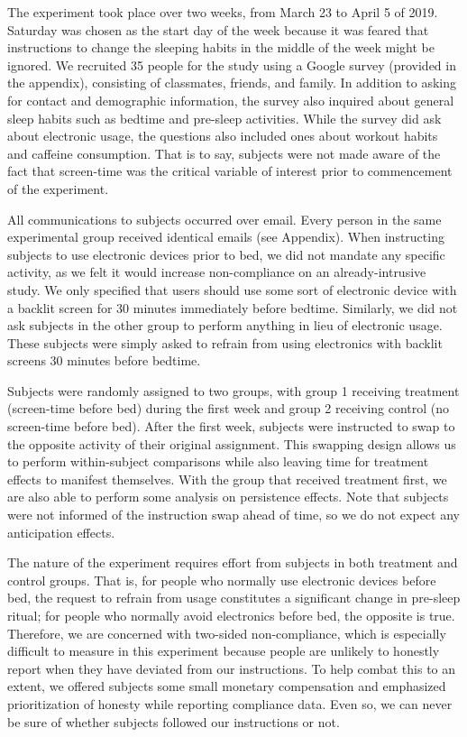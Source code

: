 \documentclass[12pt,]{article}
\begin{document}
The experiment took place over two weeks, from March 23 to April 5 of
2019. Saturday was chosen as the start day of the week because it was
feared that instructions to change the sleeping habits in the middle of
the week might be ignored. We recruited 35 people for the study using a
Google survey (provided in the appendix), consisting of classmates,
friends, and family. In addition to asking for contact and demographic
information, the survey also inquired about general sleep habits such as
bedtime and pre-sleep activities. While the survey did ask about
electronic usage, the questions also included ones about workout habits
and caffeine consumption. That is to say, subjects were not made aware
of the fact that screen-time was the critical variable of interest prior
to commencement of the experiment.

All communications to subjects occurred over email. Every person in the
same experimental group received identical emails (see Appendix). When
instructing subjects to use electronic devices prior to bed, we did not
mandate any specific activity, as we felt it would increase
non-compliance on an already-intrusive study. We only specified that
users should use some sort of electronic device with a backlit screen
for 30 minutes immediately before bedtime. Similarly, we did not ask
subjects in the other group to perform anything in lieu of electronic
usage. These subjects were simply asked to refrain from using
electronics with backlit screens 30 minutes before bedtime.

Subjects were randomly assigned to two groups, with group 1 receiving
treatment (screen-time before bed) during the first week and group 2
receiving control (no screen-time before bed). After the first week,
subjects were instructed to swap to the opposite activity of their
original assignment. This swapping design allows us to perform
within-subject comparisons while also leaving time for treatment effects
to manifest themselves. With the group that received treatment first, we
are also able to perform some analysis on persistence effects. Note that
subjects were not informed of the instruction swap ahead of time, so we
do not expect any anticipation effects.

The nature of the experiment requires effort from subjects in both
treatment and control groups. That is, for people who normally use
electronic devices before bed, the request to refrain from usage
constitutes a significant change in pre-sleep ritual; for people who
normally avoid electronics before bed, the opposite is true. Therefore,
we are concerned with two-sided non-compliance, which is especially
difficult to measure in this experiment because people are unlikely to
honestly report when they have deviated from our instructions. To help
combat this to an extent, we offered subjects some small monetary
compensation and emphasized prioritization of honesty while reporting
compliance data. Even so, we can never be sure of whether subjects
followed our instructions or not.
\end{document}
